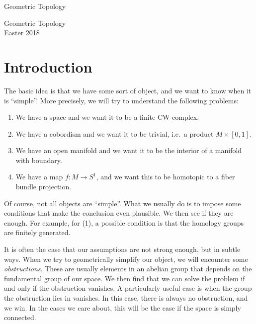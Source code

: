 \documentclass[a4paper, 12pt]{article}
\makeatletter
\theoremstyle{definition}
\renewcommand\tableofcontents{\@starttoc{toc}}
\let\LaTeXStandardTableOfContents\tableofcontents
\renewcommand{\tableofcontents}{%
\begingroup%
\renewcommand{\bfseries}{\sc}%
\LaTeXStandardTableOfContents%
\endgroup%
}%
\makeatother
\begin{document}
\hspace{0pt}
\vfill
\begin{center}
  \sc\Huge Geometric Topology\vspace{140pt}
\end{center}
\thispagestyle{empty}
\vfill
\hspace{0pt}
\pagebreak

\begin{center}
  \sc
  {\huge Geometric Topology}\vspace{20pt}\\
  {\Large Easter 2018}
\end{center}
\vspace{40pt}
\begin{center}
  \begin{minipage}{0.8\textwidth}
    \tableofcontents
  \end{minipage}
\end{center}

\thispagestyle{empty}

\setcounter{page}{1}
\pagebreak

\section{Introduction}
The basic idea is that we have some sort of object, and we want to know when it is ``simple''. More precisely, we will try to understand the following problems:
\begin{enumerate}
  \item We have a space and we want it to be a finite CW complex.
  \item We have a cobordism and we want it to be trivial, i.e.\ a product $M \times [0, 1]$.
  \item We have an open manifold and we want it to be the interior of a manifold with boundary.
  \item We have a map $f: M \to S^1$, and we want this to be homotopic to a fiber bundle projection.
\end{enumerate}
Of course, not all objects are ``simple''. What we usually do is to impose some conditions that make the conclusion even plausible. We then see if they are enough. For example, for (1), a possible condition is that the homology groups are finitely generated.

It is often the case that our assumptions are not strong enough, but in subtle ways. When we try to geometrically simplify our object, we will encounter some \emph{obstructions}. These are usually elements in an abelian group that depends on the fundamental group of our space. We then find that we can solve the problem if and only if the obstruction vanishes. A particularly useful case is when the group the obstruction lies in vanishes. In this case, there is always no obstruction, and we win. In the cases we care about, this will be the case if the space is simply connected.
\end{document}
